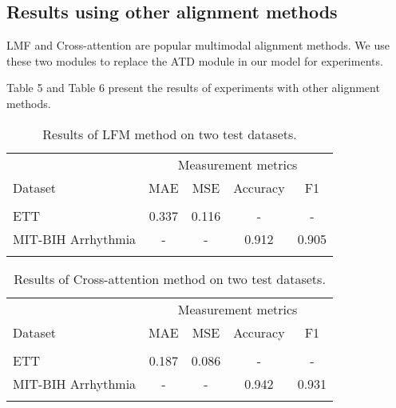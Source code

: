 \documentclass{ecai}
\begin{document}
\subsection{Results using other alignment methods}

LMF \cite{liu2018efficient} and Cross-attention \cite{lin2022cat} are popular multimodal alignment methods. We use these two modules to replace the ATD module in our model for experiments.

Table 5 and Table 6 present the results of experiments with other alignment methods. 
    
\begin{table}
\begin{center}
{\caption{Results of LFM method on two test datasets.}\label{table5}}
\begin{tabular}{lcccc}
\hline
\rule{0pt}{12pt}
&\multicolumn{4}{c}{Measurement metrics}\\
\cline{2-5}
\rule{0pt}{12pt}
Dataset &MAE &MSE &Accuracy&F1
\\
\hline
\\[-6pt]
\quad ETT & 0.337 & 0.116 & - & -\\
\quad MIT-BIH Arrhythmia & - & - & 0.912 & 0.905\\

\hline
\\[-6pt]

\end{tabular}
\end{center}
\end{table}

\begin{table}
\begin{center}
{\caption{Results of Cross-attention method on two test datasets.}\label{table6}}
\begin{tabular}{lcccc}
\hline
\rule{0pt}{12pt}
&\multicolumn{4}{c}{Measurement metrics}\\
\cline{2-5}
\rule{0pt}{12pt}
Dataset &MAE &MSE &Accuracy&F1
\\
\hline
\\[-6pt]
\quad ETT & 0.187 & 0.086 & - & -\\
\quad MIT-BIH Arrhythmia & - & - & 0.942 & 0.931\\

\hline
\\[-6pt]

\end{tabular}
\end{center}
\end{table}
\end{document}
